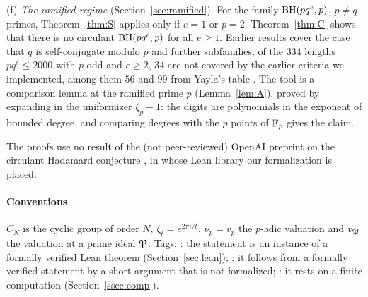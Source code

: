 (f) \emph{The ramified regime} (Section~\ref{sec:ramified}). For the
family $\operatorname{BH}(pq^e,p)$, $p\ne q$ primes, Theorem~\ref{thm:S} applies only
if $e=1$ or $p=2$. Theorem~\ref{thm:C} shows that there is no circulant
$\operatorname{BH}(pq^e,p)$ for all $e\ge1$. Earlier results cover the case that $q$ is
self-conjugate modulo $p$ \cite[Thm.~3.3]{DoDuc2019} and further
subfamilies; of the $334$ lengths $pq^e\le2000$ with $p$ odd and $e\ge2$,
$34$ are not covered by the earlier criteria we implemented, among them
$56$ and $99$ from Yayla's table \cite{Yayla2016}. The tool is a
comparison lemma at the ramified prime $p$ (Lemma~\ref{lem:A}), proved by
expanding in the uniformizer $\zeta_p-1$: the digits are polynomials in
the exponent of bounded degree, and comparing degrees with the $p$ points
of $\mathbb{F}_p$ gives the claim.

The proofs use no result of the (not peer-reviewed) OpenAI preprint on
the circulant Hadamard conjecture \cite{OpenAI2026}, in whose Lean
library our formalization is placed.

\paragraph{Conventions}
$C_N$ is the cyclic group of order $N$, $\zeta_t=e^{2\pi i/t}$,
$\nu_p=v_p$ the $p$-adic valuation and $v_{\mathfrak{P}}$ the valuation at a prime
ideal $\mathfrak{P}$. Tags: : the statement is an instance of a
formally verified Lean theorem (Section~\ref{sec:lean});
: it follows from a formally verified statement by a
short argument that is not formalized; : it rests on a
finite computation (Section~\ref{ssec:comp}).
